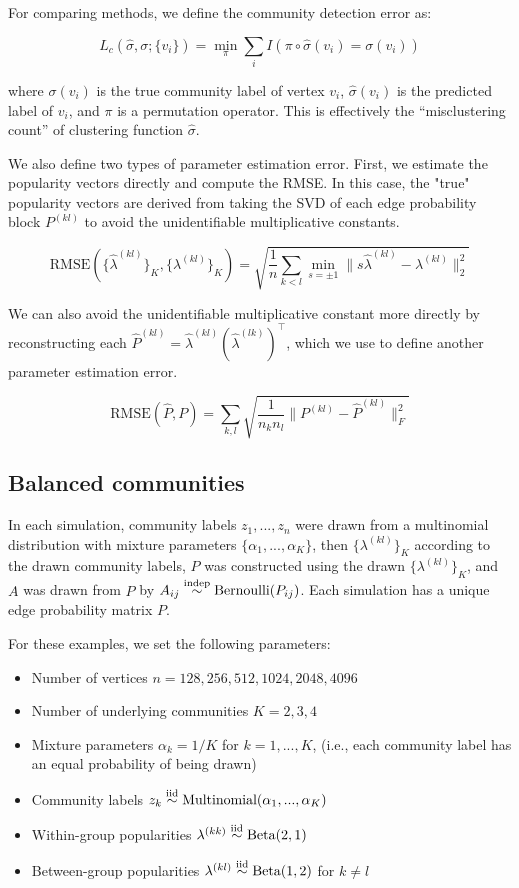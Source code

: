 \documentclass[12pt]{article}
\providecommand{\tightlist}{%
  \setlength{\itemsep}{0pt}\setlength{\parskip}{0pt}}
\begin{document}
For comparing methods, we define the community detection error as:

\[L_c(\hat{\sigma}, \sigma; \{v_i\}) =
\min_\pi \sum_i I(\pi \circ \hat{\sigma}(v_i) = \sigma(v_i))\]

where \(\sigma(v_i)\) is the true community label of vertex \(v_i\),
\(\hat{\sigma}(v_i)\) is the predicted label of \(v_i\), and \(\pi\) is
a permutation operator. This is effectively the ``misclustering count''
of clustering function \(\hat{\sigma}\).

We also define two types of parameter estimation error. 
First, we estimate the popularity vectors directly and compute the RMSE. 
In this case, the "true" popularity vectors are derived from 
taking the SVD of each edge probability block $P^{(kl)}$ 
to avoid the unidentifiable multiplicative constants. 

\[\text{RMSE}(\{\hat{\lambda}^{(kl)}\}_K, \{\lambda^{(kl)}\}_K) = 
\sqrt{\frac{1}{n} \sum_{k < l} \min_{s = \pm 1} 
\|s \hat{\lambda}^{(kl)} - \lambda^{(kl)} \|_2^2}\]

We can also avoid the unidentifiable multiplicative constant more directly 
by reconstructing each 
$\hat{P}^{(kl)} = \hat{\lambda}^{(kl)} (\hat{\lambda}^{(lk)})^\top$, 
which we use to define another parameter estimation error. 

\[\text{RMSE}(\hat{P}, P) =
\sum_{k,l} \sqrt{\frac{1}{n_k n_l} \|P^{(kl)} - \hat{P}^{(kl)}\|_F^2}\]

\hypertarget{balanced-communities}{%
\subsection{Balanced communities}\label{balanced-communities}}

In each simulation, community labels \(z_1, ..., z_n\) were drawn from a
multinomial distribution with mixture parameters
\(\{\alpha_1, ..., \alpha_K\}\), then \(\{\lambda^{(kl)}\}_K\) according
to the drawn community labels, \(P\) was constructed using the drawn
\(\{\lambda^{(kl)}\}_K\), and \(A\) was drawn from \(P\) by
\(A_{ij} \stackrel{\text{indep}}{\sim} \text{Bernoulli}(P_{ij})\). Each simulation has
a unique edge probability matrix \(P\).

For these examples, we set the following parameters:

\begin{itemize}
\tightlist
\item
  Number of vertices \(n = 128, 256, 512, 1024, 2048, 4096\)
\item
  Number of underlying communities \(K = 2, 3, 4\)
\item
  Mixture parameters \(\alpha_k = 1 / K\) for \(k = 1, ..., K\), (i.e.,
  each community label has an equal probability of being drawn)
\item
  Community labels
  \(z_k \stackrel{\text{iid}}{\sim} \text{Multinomial}(\alpha_1, ..., \alpha_K)\)
\item
  Within-group popularities
  \(\lambda^{(kk)} \stackrel{\text{iid}}{\sim} \text{Beta}(2, 1)\)
\item
  Between-group popularities
  \(\lambda^{(kl)} \stackrel{\text{iid}}{\sim} \text{Beta}(1, 2)\) for
  \(k \neq l\)
\end{itemize}
\end{document}
